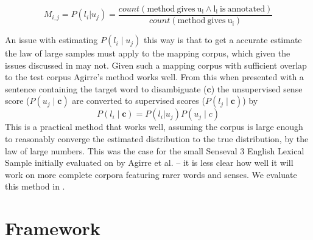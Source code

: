 \documentclass{sig-alternate}
\renewcommand{\c}{\mathbf{c}}
\begin{document}
\begin{equation} \label{eq:agirremap}
M_{i,j} = P(l_i | u_j) = \frac{count(\mathrm{method\: gives\: u_i \wedge l_i\: is\: annotated})}{count(\mathrm{method\: gives\: u_i})}
\end{equation}

An issue with estimating $P(l_i \mid u_j)$ this way is that to get a accurate estimate the law of large samples must apply to the mapping corpus, which given the issues discussed in  may not. Given such a mapping corpus with sufficient overlap to the test corpus Agirre's method works well. 
From this  when presented with a sentence containing the target word to disambiguate ($\c$) the unsupervised sense score ($P(u_j \mid \c)$ are converted to supervised scores ($P(l_j \mid \c)$) by 
\begin{equation} \label{eq:agireewsd}
P(l_i \mid \c) = P(l_i | u_j) P(u_j \mid c)
\end{equation}
This is a practical method that works well, assuming the corpus is large enough to reasonably converge the estimated distribution to the true distribution, by the law of large numbers. This was the case for the small Senseval 3 English Lexical Sample \parencite{mihalcea2004senseval} initially evaluated on by Agirre et al. -- it is less clear how well it will work on more complete corpora featuring rarer words and senses.
We evaluate this method in .



\section{Framework} \label{Frameword}
\end{document}
